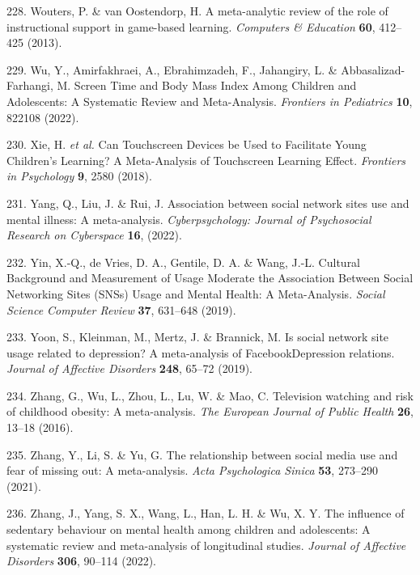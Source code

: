 \documentclass[
  english,
  man]{apa6}
\newenvironment{cslreferences}%
  {}%
  {\par}
\begin{document}
\begin{cslreferences}
\leavevmode\hypertarget{ref-woutersMetaanalyticReviewRole2013}{}%
228. Wouters, P. \& van Oostendorp, H. A meta-analytic review of the role of instructional support in game-based learning. \emph{Computers \& Education} \textbf{60}, 412--425 (2013).

\leavevmode\hypertarget{ref-wuScreenTimeBody2022}{}%
229. Wu, Y., Amirfakhraei, A., Ebrahimzadeh, F., Jahangiry, L. \& Abbasalizad-Farhangi, M. Screen Time and Body Mass Index Among Children and Adolescents: A Systematic Review and Meta-Analysis. \emph{Frontiers in Pediatrics} \textbf{10}, 822108 (2022).

\leavevmode\hypertarget{ref-xieCanTouchscreenDevices2018}{}%
230. Xie, H. \emph{et al.} Can Touchscreen Devices be Used to Facilitate Young Children's Learning? A Meta-Analysis of Touchscreen Learning Effect. \emph{Frontiers in Psychology} \textbf{9}, 2580 (2018).

\leavevmode\hypertarget{ref-yangAssociationSocialNetwork2022}{}%
231. Yang, Q., Liu, J. \& Rui, J. Association between social network sites use and mental illness: A meta-analysis. \emph{Cyberpsychology: Journal of Psychosocial Research on Cyberspace} \textbf{16}, (2022).

\leavevmode\hypertarget{ref-yinCulturalBackgroundMeasurement2019}{}%
232. Yin, X.-Q., de Vries, D. A., Gentile, D. A. \& Wang, J.-L. Cultural Background and Measurement of Usage Moderate the Association Between Social Networking Sites (SNSs) Usage and Mental Health: A Meta-Analysis. \emph{Social Science Computer Review} \textbf{37}, 631--648 (2019).

\leavevmode\hypertarget{ref-yoonSocialNetworkSite2019}{}%
233. Yoon, S., Kleinman, M., Mertz, J. \& Brannick, M. Is social network site usage related to depression? A meta-analysis of FacebookDepression relations. \emph{Journal of Affective Disorders} \textbf{248}, 65--72 (2019).

\leavevmode\hypertarget{ref-zhangTelevisionWatchingRisk2016}{}%
234. Zhang, G., Wu, L., Zhou, L., Lu, W. \& Mao, C. Television watching and risk of childhood obesity: A meta-analysis. \emph{The European Journal of Public Health} \textbf{26}, 13--18 (2016).

\leavevmode\hypertarget{ref-zhangRelationshipSocialMedia2021}{}%
235. Zhang, Y., Li, S. \& Yu, G. The relationship between social media use and fear of missing out: A meta-analysis. \emph{Acta Psychologica Sinica} \textbf{53}, 273--290 (2021).

\leavevmode\hypertarget{ref-zhangInfluenceSedentaryBehaviour2022}{}%
236. Zhang, J., Yang, S. X., Wang, L., Han, L. H. \& Wu, X. Y. The influence of sedentary behaviour on mental health among children and adolescents: A systematic review and meta-analysis of longitudinal studies. \emph{Journal of Affective Disorders} \textbf{306}, 90--114 (2022).


\end{cslreferences}
\end{document}
